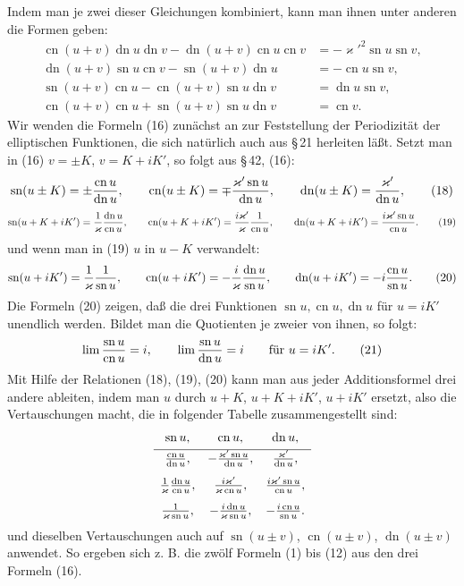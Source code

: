 \documentclass[11pt]{article}
\providecommand{\sn}{\operatorname{sn}}
\providecommand{\cn}{\operatorname{cn}}
\providecommand{\dn}{\operatorname{dn}}
\begin{document}
Indem man je zwei dieser Gleichungen kombiniert, kann man ihnen unter anderen die Formen geben:
\begin{equation}
\begin{aligned}
\cn(u+v)\dn u\dn v-\dn(u+v)\cn u\cn v&=-\varkappa'^2\sn u\sn v,\\
\dn(u+v)\sn u\cn v-\sn(u+v)\dn u&=-\cn u\sn v,\\
\sn(u+v)\cn u-\cn(u+v)\sn u\dn v&=\dn u\sn v,\\
\cn(u+v)\cn u+\sn(u+v)\sn u\dn v&=\cn v.
\end{aligned}
\tag{17}
\end{equation}
Wir wenden die Formeln (16) zunächst an zur Feststellung der Periodizität der elliptischen Funktionen, die sich natürlich auch aus \S\,21 herleiten läßt. Setzt man in (16) $v=\pm K$, $v=K+iK'$, so folgt aus \S\,42, (16):
\begin{equation}
\sn(u\pm K)=\pm{\cn u\over\dn u},
\qquad
\cn(u\pm K)=\mp{\varkappa'\sn u\over\dn u},
\qquad
\dn(u\pm K)={\varkappa'\over\dn u},
\tag{18}
\end{equation}
\begin{equation}
\sn(u+K+iK')={1\over\varkappa}{\dn u\over\cn u},
\qquad
\cn(u+K+iK')={i\varkappa'\over\varkappa}{1\over\cn u},
\qquad
\dn(u+K+iK')={i\varkappa'\sn u\over\cn u}.
\tag{19}
\end{equation}
und wenn man in (19) $u$ in $u-K$ verwandelt:
\begin{equation}
\sn(u+iK')={1\over\varkappa}{1\over\sn u},
\qquad
\cn(u+iK')=-{i\over\varkappa}{\dn u\over\sn u},
\qquad
\dn(u+iK')=-i{\cn u\over\sn u}.
\tag{20}
\end{equation}
Die Formeln (20) zeigen, daß die drei Funktionen $\sn u,\cn u,\dn u$ für $u=iK'$ unendlich werden. Bildet man die Quotienten je zweier von ihnen, so folgt:
\begin{equation}
\lim{\sn u\over\cn u}=i,
\qquad
\lim{\sn u\over\dn u}=i
\qquad\text{für }u=iK'.
\tag{21}
\end{equation}
Mit Hilfe der Relationen (18), (19), (20) kann man aus jeder Additionsformel drei andere ableiten, indem man $u$ durch $u+K$, $u+K+iK'$, $u+iK'$ ersetzt, also die Vertauschungen macht, die in folgender Tabelle zusammengestellt sind:
\[
\begin{array}{ccc}
\sn u,&\cn u,&\dn u,\\[0.3em]\hline
{\cn u\over\dn u},&-{\varkappa'\sn u\over\dn u},&{\varkappa'\over\dn u},\\[0.8em]
{1\over\varkappa}{\dn u\over\cn u},&{i\varkappa'\over\varkappa\cn u},&{i\varkappa'\sn u\over\cn u},\\[0.8em]
{1\over\varkappa\sn u},&-{i\dn u\over\varkappa\sn u},&-{i\cn u\over\sn u}.
\end{array}
\]
und dieselben Vertauschungen auch auf $\sn(u\pm v)$, $\cn(u\pm v)$, $\dn(u\pm v)$ anwendet. So ergeben sich z. B. die zwölf Formeln (1) bis (12) aus den drei Formeln (16).
\end{document}
